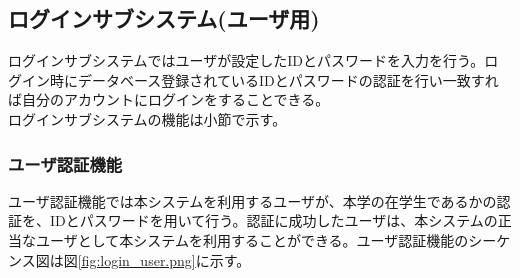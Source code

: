 \documentclass[a4j]{jarticle}
\begin{document}
  \subsection{ログインサブシステム(ユーザ用)}
  ログインサブシステムではユーザが設定したIDとパスワードを入力を行う。ログイン時にデータベース登録されているIDとパスワードの認証を行い一致すれば自分のアカウントにログインをすることできる。\\
  ログインサブシステムの機能は小節で示す。
  \subsubsection{ユーザ認証機能}
  ユーザ認証機能では本システムを利用するユーザが、本学の在学生であるかの認証を、IDとパスワードを用いて行う。認証に成功したユーザは、本システムの正当なユーザとして本システムを利用することができる。ユーザ認証機能のシーケンス図は図\ref{fig:login_user.png}に示す。
\end{document}
